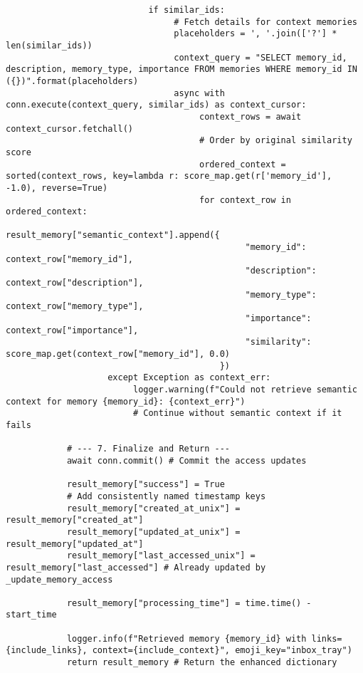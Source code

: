 \documentclass[12pt,a4paper]{article}
\begin{document}
\begin{pageablecode}
\begin{verbatim}
                            if similar_ids:
                                 # Fetch details for context memories
                                 placeholders = ', '.join(['?'] * len(similar_ids))
                                 context_query = "SELECT memory_id, description, memory_type, importance FROM memories WHERE memory_id IN ({})".format(placeholders)
                                 async with conn.execute(context_query, similar_ids) as context_cursor:
                                      context_rows = await context_cursor.fetchall()
                                      # Order by original similarity score
                                      ordered_context = sorted(context_rows, key=lambda r: score_map.get(r['memory_id'], -1.0), reverse=True)
                                      for context_row in ordered_context:
                                          result_memory["semantic_context"].append({
                                               "memory_id": context_row["memory_id"],
                                               "description": context_row["description"],
                                               "memory_type": context_row["memory_type"],
                                               "importance": context_row["importance"],
                                               "similarity": score_map.get(context_row["memory_id"], 0.0)
                                          })
                    except Exception as context_err:
                         logger.warning(f"Could not retrieve semantic context for memory {memory_id}: {context_err}")
                         # Continue without semantic context if it fails

            # --- 7. Finalize and Return ---
            await conn.commit() # Commit the access updates

            result_memory["success"] = True
            # Add consistently named timestamp keys
            result_memory["created_at_unix"] = result_memory["created_at"]
            result_memory["updated_at_unix"] = result_memory["updated_at"]
            result_memory["last_accessed_unix"] = result_memory["last_accessed"] # Already updated by _update_memory_access

            result_memory["processing_time"] = time.time() - start_time

            logger.info(f"Retrieved memory {memory_id} with links={include_links}, context={include_context}", emoji_key="inbox_tray")
            return result_memory # Return the enhanced dictionary


\end{verbatim}
\end{pageablecode}
\end{document}
